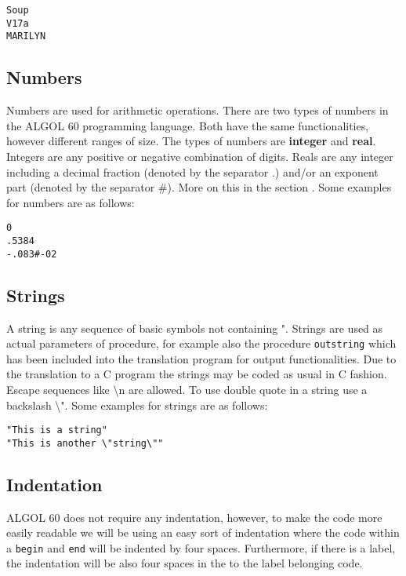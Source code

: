 \documentclass{article}
\begin{document}
\begin{lstlisting}[language={[60]algol}]
Soup
V17a
MARILYN
\end{lstlisting}

\subsection{Numbers} \label{numbers}
Numbers are used for arithmetic operations. There are two types of numbers in the ALGOL 60 programming language. Both have the same functionalities, however different ranges of size. The types of numbers are \textbf{integer} and \textbf{real}. Integers are any positive or negative combination of digits. Reals are any integer including a decimal fraction (denoted by the separator .) and/or an exponent part (denoted by the separator \#). More on this in the section . Some examples for numbers are as follows:\\

\begin{lstlisting}[language={[60]algol}]
0
.5384
-.083#-02
\end{lstlisting}

\subsection{Strings}
A string is any sequence of basic symbols not containing ". Strings are used as actual parameters of procedure, for example also the procedure \texttt{outstring} which has been included into the translation program for output functionalities. Due to the translation to a C program the strings may be coded as usual in C fashion. Escape sequences like \textbackslash n are allowed. To use double quote in a string use a backslash \textbackslash". Some examples for strings are as follows:\\

\begin{lstlisting}[language={[60]algol}]
"This is a string"
"This is another \"string\""
\end{lstlisting}

\subsection{Indentation}
ALGOL 60 does not require any indentation, however, to make the code more easily readable we will be using an easy sort of indentation where the code within a \texttt{begin} and \texttt{end} will be indented by four spaces. Furthermore, if there is a label, the indentation will be also four spaces in the to the label belonging code.
\end{document}
